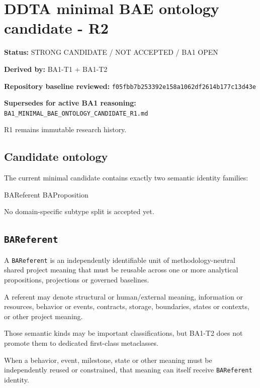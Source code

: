 \documentclass[
  10pt,
]{article}
\author{}
\date{}
\newenvironment{Shaded}{}{}
\newcommand{\NormalTok}[1]{#1}
\begin{document}
\section{DDTA minimal BAE ontology candidate -
R2}\label{ddta-minimal-bae-ontology-candidate---r2}

\textbf{Status:} STRONG CANDIDATE / NOT ACCEPTED / BA1 OPEN

\textbf{Derived by:} BA1-T1 + BA1-T2

\textbf{Repository baseline reviewed:}
\texttt{f05fbb7b253392e158a1062df2614b177c13d43e}

\textbf{Supersedes for active BA1 reasoning:}
\texttt{BA1\_MINIMAL\_BAE\_ONTOLOGY\_CANDIDATE\_R1.md}

R1 remains immutable research history.

\subsection{Candidate ontology}\label{candidate-ontology}

The current minimal candidate contains exactly two semantic identity
families:

\begin{Shaded}
\begin{Highlighting}[]
\NormalTok{BAReferent}
\NormalTok{BAProposition}
\end{Highlighting}
\end{Shaded}

No domain-specific subtype split is accepted yet.

\subsection{\texorpdfstring{\texttt{BAReferent}}{BAReferent}}\label{bareferent}

A \texttt{BAReferent} is an independently identifiable unit of
methodology-neutral shared project meaning that must be reusable across
one or more analytical propositions, projections or governed baselines.

A referent may denote structural or human/external meaning, information
or resources, behavior or events, contracts, storage, boundaries, states
or contexts, or other project meaning.

Those semantic kinds may be important classifications, but BA1-T2 does
not promote them to dedicated first-class metaclasses.

When a behavior, event, milestone, state or other meaning must be
independently reused or constrained, that meaning can itself receive
\texttt{BAReferent} identity.
\end{document}
